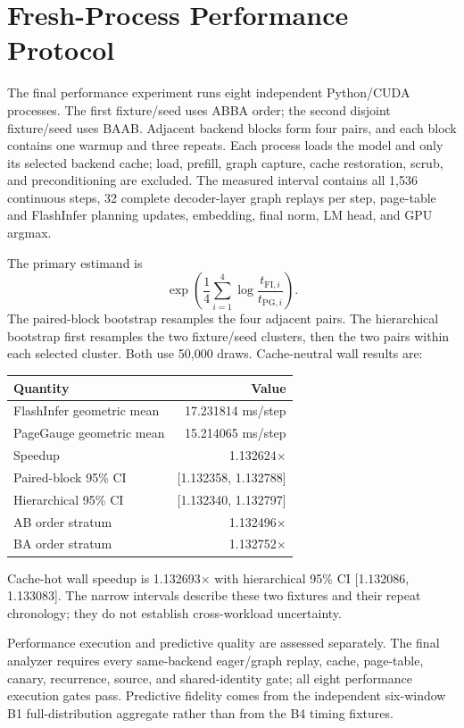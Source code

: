 \section{Fresh-Process Performance Protocol}

The final performance experiment runs eight independent Python/CUDA processes.
The first fixture/seed uses ABBA order; the second disjoint fixture/seed uses
BAAB. Adjacent backend blocks form four pairs, and each block contains one
warmup and three repeats. Each process loads the model and only its selected
backend cache; load, prefill, graph capture, cache restoration, scrub, and
preconditioning are excluded. The measured interval contains all 1,536
continuous steps, 32 complete decoder-layer graph replays per step, page-table
and FlashInfer planning updates, embedding, final norm, LM head, and GPU argmax.

The primary estimand is
\[
\exp\left(\frac1{4}\sum_{i=1}^4\log\frac{t_{\mathrm{FI},i}}
{t_{\mathrm{PG},i}}\right).
\]
The paired-block bootstrap resamples the four adjacent pairs. The hierarchical
bootstrap first resamples the two fixture/seed clusters, then the two pairs
within each selected cluster. Both use 50,000 draws. Cache-neutral wall results
are:
\begin{center}
\begin{tabular}{lr}
\toprule
Quantity & Value \\
\midrule
FlashInfer geometric mean & 17.231814 ms/step \\
PageGauge geometric mean & 15.214065 ms/step \\
Speedup & 1.132624$\times$ \\
Paired-block 95\% CI & [1.132358, 1.132788] \\
Hierarchical 95\% CI & [1.132340, 1.132797] \\
AB order stratum & 1.132496$\times$ \\
BA order stratum & 1.132752$\times$ \\
\bottomrule
\end{tabular}
\end{center}
Cache-hot wall speedup is 1.132693$\times$ with hierarchical 95\% CI
[1.132086, 1.133083]. The narrow intervals describe these two fixtures and
their repeat chronology; they do not establish cross-workload uncertainty.

Performance execution and predictive quality are assessed separately. The final
analyzer requires every same-backend eager/graph replay, cache, page-table,
canary, recurrence, source, and shared-identity gate; all eight performance
execution gates pass. Predictive fidelity comes from the independent six-window
B1 full-distribution aggregate rather than from the B4 timing fixtures.

